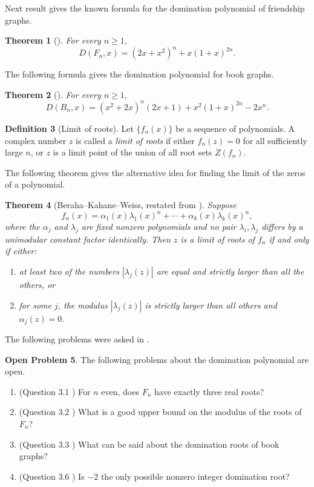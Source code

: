 \documentclass[12pt]{article}
\newtheorem{theorem}{Theorem}[section]
\theoremstyle{definition}
\newtheorem{definition}[theorem]{Definition}
\newtheorem{openproblem}[theorem]{Open Problem}
\begin{document}
	Next result gives the known formula for the domination polynomial of friendship graphs.
	\begin{theorem}[\cite{AlikhaniBrownJahari2016}]
		\label{thm:knownFn}
		For every $n\ge 1$,
		$$
		D(F_n,x)=(2x+x^2)^n+x(1+x)^{2n}.
		$$
	\end{theorem}
	
	The following formula gives the domination polynomial for book graphs.
	\begin{theorem}[\cite{AlikhaniBrownJahari2016}]
		\label{thm:knownBn}
		For every $n\ge 1$,
		$$
		D(B_n,x)=(x^2+2x)^n(2x+1)+x^2(1+x)^{2n}-2x^n.
		$$
	\end{theorem}
	
	
	\begin{definition}[Limit of roots]
		Let $\{f_n(x)\}$ be a sequence of polynomials. A complex number $z$ is called a \emph{limit of roots} if either $f_n(z)=0$ for all sufficiently large $n$, or $z$ is a limit point of the union of all root sets $Z(f_n)$.
	\end{definition}
	
	The following theorem gives the alternative idea for finding the limit of the zeros of a polynomial.
	\begin{theorem}[Beraha--Kahane--Weiss, restated from \cite{BerahaKahaneWeiss1978,BrownHickman2002}]
		\label{thm:BKW}
		Suppose
		$$
		f_n(x)=\alpha_1(x)\lambda_1(x)^n+\cdots+\alpha_k(x)\lambda_k(x)^n,
		$$
		where the $\alpha_j$ and $\lambda_j$ are fixed nonzero polynomials and no pair $\lambda_i,\lambda_j$ differs by a unimodular constant factor identically. Then $z$ is a limit of roots of ${f_n}$ if and only if either:
		\begin{enumerate}[label=\textup{(\roman*)}]
			\item at least two of the numbers $|\lambda_j(z)|$ are equal and strictly larger than all the others, or
			\item for some $j$, the modulus $|\lambda_j(z)|$ is strictly larger than all others and $\alpha_j(z)=0$.
		\end{enumerate}
	\end{theorem}
	
	The following problems were asked in \cite{AlikhaniBrownJahari2016}.
	\begin{openproblem}\label{problem}
		The following problems about the domination polynomial are open.
		\begin{enumerate}[label=\textup{(\roman*)}]
			\item (Question 3.1 \cite{AlikhaniBrownJahari2016}) For $n$ even, does $F_{n}$ have exactly three real roots?
			\item (Question 3.2 \cite{AlikhaniBrownJahari2016}) What is a good upper bound on the modulus of the roots of $F_{n}$?
			\item (Question 3.3 \cite{AlikhaniBrownJahari2016}) What can be said about the domination roots of book graphs?
			\item (Question 3.6 \cite{AlikhaniBrownJahari2016}) Is $-2$ the only possible nonzero integer domination root?
		\end{enumerate}	
	\end{openproblem}
	
\end{document}
